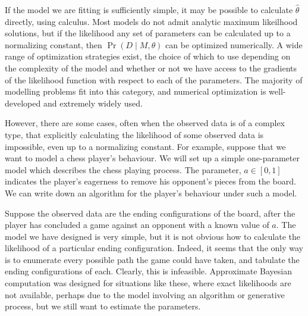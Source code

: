 If the model we are fitting is sufficiently simple, it may be possible to
calculate $\hat{\theta}$ directly, using calculus. Most models do not admit
analytic maximum likeilhood solutions, but if the likelihood any set of
parameters can be calculated up to a normalizing constant, then
${\Pr(D \mid M,\theta)}$ can be optimized numerically. A wide range of
optimization strategies exist, the choice of which to use depending on the
complexity of the model and whether or not we have access to the gradients of
the likelihood function with respect to each of the parameters. The majority of
modelling problems fit into this category, and numerical optimization is
well-developed and extremely widely used.

However, there are some cases, often when the observed data is of a complex
type, that explicitly calculating the likelihood of some observed data is
impossible, even up to a normalizing constant. For example, suppose that we
want to model a chess player's behaviour. We will set up a simple one-parameter
model which describes the chess playing process.  The parameter, $a \in [0, 1]$
indicates the player's eagerness to remove his opponent's pieces from the
board. We can write down an algorithm for the player's behaviour under such a
model.


\begin{algorithmic}
    \Else
    \EndIf
  \EndWhile
\end{algorithmic}

Suppose the observed data are the ending configurations of the board, after the
player has concluded a game against an opponent with a known value of $a$. The
model we have designed is very simple, but it is not obvious how to calculate
the likelihood of a particular ending configuration. Indeed, it seems that the
only way is to enumerate every possible path the game could have taken, and
tabulate the ending configurations of each. Clearly, this is infeasible.
Approximate Bayesian computation was designed for situations like these, where
exact likelihoods are not available, perhaps due to the model involving an
algorithm or generative process, but we still want to estimate the parameters.
